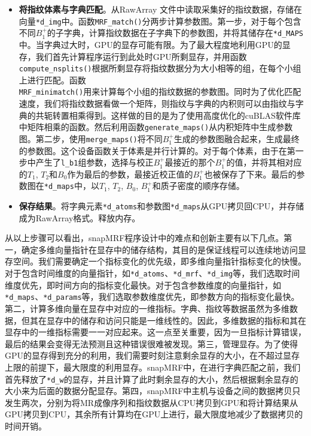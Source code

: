 \begin{itemize}
\item \textbf{将指纹体素与字典匹配}。从RawArray \cite{RawArray}文件中读取采集好的指纹数据，存储在向量\texttt{*d\_img}中。函数\texttt{MRF\_match()}分两步计算参数图。第一步，对于每个包含不同$B_1^+$的子字典，计算指纹数据在子字典下的参数图，并将其储存在\texttt{*d\_MAPS}中。当字典过大时，GPU的显存可能有限。为了最大程度地利用GPU的显存，我们首先计算程序运行到此处时GPU所剩显存，并用函数\texttt{compute\_nsplits()}根据所剩显存将指纹数据分为大小相等的组，在每个小组上进行匹配。函数\\ \texttt{MRF\_minimatch()}用来计算每个小组的指纹数据的参数图。同时为了优化匹配速度，我们将指纹数据看做一个矩阵，则指纹与字典的内积则可以由指纹与字典的共轭转置相乘得到。这样做的目的是为了使用高度优化的cuBLAS软件库中矩阵相乘的函数。然后利用函数\texttt{generate\_maps()}从内积矩阵中生成参数图。第二步，使用\texttt{merge\_maps()}将不同$B_1^+$生成的参数图融合起来，生成最终的参数图。这个设备函数关于体素是并行计算的。对于每个体素，由于在第一步中产生了\texttt{l\_b1}组参数，选择与校正$B_1^+$最接近的那个$B_1^+$的值，并将其相对应的$T_1$, $T_2$和$B_0$作为最后的参数，最接近校正值的$B_1^+$也被保存了下来。最后的参数图在\texttt{*d\_maps}中，以$T_1$, $T_2$, $B_0$, $B_1^+$和质子密度的顺序存储。

\item \textbf{保存结果}。将字典元素\texttt{*d\_atoms}和参数图\texttt{*d\_maps}从GPU拷贝回CPU，并存储成为RawArray格式。释放内存。

\end{itemize}

从以上步骤可以看出，snapMRF程序设计中的难点和创新主要有以下几点。第一，确定多维向量指针在显存中的储存结构，其目的是保证线程可以连续地访问显存空间。我们需要确定一个指标变化的优先级，即多维向量指针指标变化的快慢。对于包含时间维度的向量指针，如\texttt{*d\_atoms}、\texttt{*d\_mrf}、\texttt{*d\_img}等，我们选取时间维度优先，即时间方向的指标变化最快。对于包含参数维度的向量指针，如\texttt{*d\_maps}、\texttt{*d\_params}等，我们选取参数维度优先，即参数方向的指标变化最快。第二，计算多维向量在显存中对应的一维指标。字典、指纹等数据虽然为多维数据，但其在显存中的储存和访问只能是一维线性的。因此，多维数据的指标和其在显存中的一维指标需要一一对应起来。这一点至关重要，因为一旦指标计算错误，最后的结果会变得无法预测且这种错误很难被发现。第三，管理显存。为了使得GPU的显存得到充分的利用，我们需要时刻注意剩余显存的大小，在不超过显存上限的前提下，最大限度的利用显存。snapMRF中，在进行字典匹配之前，我们首先释放了\texttt{*d\_w}的显存，并且计算了此时剩余显存的大小，然后根据剩余显存的大小来为后面的数据分配显存。第四，snapMRF中主机与设备之间的数据拷贝只发生两次，分别为将MR成像序列和指纹数据从CPU拷贝到GPU和将计算结果从GPU拷贝到CPU，其余所有计算均在GPU上进行，最大限度地减少了数据拷贝的时间开销。

